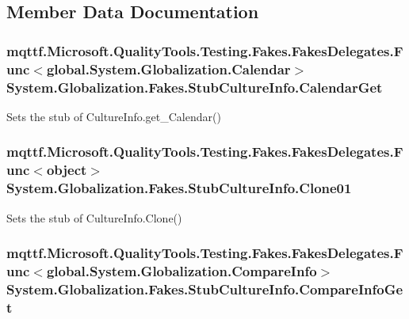 \subsection{Member Data Documentation}
\hypertarget{class_system_1_1_globalization_1_1_fakes_1_1_stub_culture_info_a78f57328e4ba480f03d9d9642dbb22d4}{
\subsubsection[{Calendar\-Get}]{\setlength{\rightskip}{0pt plus 5cm}mqttf.\-Microsoft.\-Quality\-Tools.\-Testing.\-Fakes.\-Fakes\-Delegates.\-Func$<$global.\-System.\-Globalization.\-Calendar$>$ System.\-Globalization.\-Fakes.\-Stub\-Culture\-Info.\-Calendar\-Get}}\label{class_system_1_1_globalization_1_1_fakes_1_1_stub_culture_info_a78f57328e4ba480f03d9d9642dbb22d4}


Sets the stub of Culture\-Info.\-get\-\_\-\-Calendar()

\hypertarget{class_system_1_1_globalization_1_1_fakes_1_1_stub_culture_info_ab15f2a25521d963e77dfddb273a06862}{
\subsubsection[{Clone01}]{\setlength{\rightskip}{0pt plus 5cm}mqttf.\-Microsoft.\-Quality\-Tools.\-Testing.\-Fakes.\-Fakes\-Delegates.\-Func$<$object$>$ System.\-Globalization.\-Fakes.\-Stub\-Culture\-Info.\-Clone01}}\label{class_system_1_1_globalization_1_1_fakes_1_1_stub_culture_info_ab15f2a25521d963e77dfddb273a06862}


Sets the stub of Culture\-Info.\-Clone()

\hypertarget{class_system_1_1_globalization_1_1_fakes_1_1_stub_culture_info_ad4418eef257c9465449a8dc2b6a950ed}{
\subsubsection[{Compare\-Info\-Get}]{\setlength{\rightskip}{0pt plus 5cm}mqttf.\-Microsoft.\-Quality\-Tools.\-Testing.\-Fakes.\-Fakes\-Delegates.\-Func$<$global.\-System.\-Globalization.\-Compare\-Info$>$ System.\-Globalization.\-Fakes.\-Stub\-Culture\-Info.\-Compare\-Info\-Get}}\label{class_system_1_1_globalization_1_1_fakes_1_1_stub_culture_info_ad4418eef257c9465449a8dc2b6a950ed}


